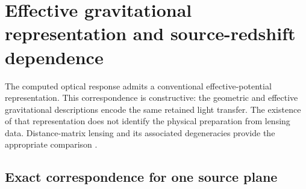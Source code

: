 \section{Effective gravitational representation and source-redshift dependence}
\label{sec:representation}

The computed optical response admits a conventional effective-potential
representation. This correspondence is constructive: the geometric and
effective gravitational descriptions encode the same retained light transfer.
The existence of that representation does not identify the physical
preparation from lensing data. Distance-matrix lensing and its associated
degeneracies provide the appropriate comparison
\cite{Fleury2021Arbitrary,Schneider2019Multiplane,SchneiderSluse2014SPT}.

\subsection{Exact correspondence for one source plane}

